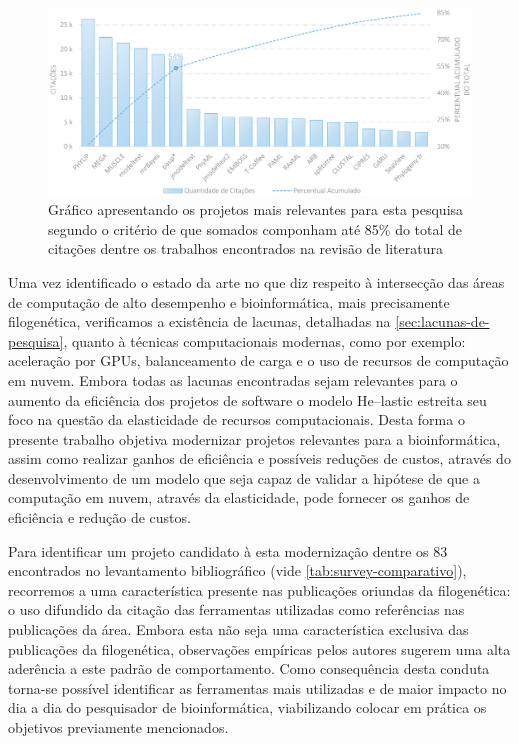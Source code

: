 \documentclass[english,brazilian]{UNISINOSmonografia} %
\newcommand\defaultFigureWidth{0.9}
\begin{document}
\begin{figure}[tb]
	\centering%
	\begin{minipage}{\defaultFigureWidth\textwidth}
		\caption{Gráfico apresentando os projetos mais relevantes para esta pesquisa segundo o critério de que somados componham até 85\% do total de citações dentre os trabalhos encontrados na revisão de literatura}
		\label{fig:survey-topcitations}
		\vspace{1ex}
		\includegraphics[width=\textwidth]{survey-topcitations}
	\end{minipage}
\end{figure}


Uma vez identificado o estado da arte no que diz respeito à intersecção das áreas de computação de alto desempenho e bioinformática, mais precisamente filogenética, verificamos a existência de lacunas, detalhadas na \autoref{sec:lacunas-de-pesquisa}, quanto à técnicas computacionais modernas, como por exemplo: aceleração por GPUs, balanceamento de carga e o uso de recursos de computação em nuvem.
Embora todas as lacunas encontradas sejam relevantes para o aumento da eficiência dos projetos de software o modelo \textsf{He}--lastic estreita seu foco na questão da elasticidade de recursos computacionais.
Desta forma o presente trabalho objetiva modernizar projetos relevantes para a bioinformática, assim como realizar ganhos de eficiência e possíveis reduções de custos, através do desenvolvimento de um modelo que seja capaz de validar a hipótese de que a computação em nuvem, através da elasticidade, pode fornecer os ganhos de eficiência e redução de custos.


Para identificar um projeto candidato à esta modernização dentre os 83 encontrados no levantamento bibliográfico (vide \autoref{tab:survey-comparativo}), recorremos a uma característica presente nas publicações oriundas da filogenética: o uso difundido da citação das ferramentas utilizadas como referências nas publicações da área.
Embora esta não seja uma característica exclusiva das publicações da filogenética, observações empíricas pelos autores sugerem uma alta aderência a este padrão de comportamento.
Como consequência desta conduta torna-se possível identificar as ferramentas mais utilizadas e de maior impacto no dia a dia do pesquisador de bioinformática, viabilizando colocar em prática os objetivos previamente mencionados.
\end{document}
